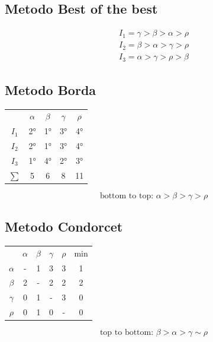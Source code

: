 \documentclass[fontsize=8pt]{scrartcl}
\begin{document}
\begin{multicols*}{2}
\subsection*{Metodo Best of the best}

\begin{align*}
    I_1 = \gamma > \beta > \alpha > \rho\\
    I_2 = \beta > \alpha > \gamma > \rho\\
    I_3 = \alpha > \gamma > \rho > \beta
\end{align*}

\subsection*{Metodo Borda}

\begin{center}
    \begin{tabular}{c c c c c}
                    & \(\alpha\)  & \(\beta\) & \(\gamma\)& \(\rho\)\\
            \(I_1\) & 2°  & 1° & 3° & 4°\\
            \(I_2\) & 2° & 1° & 3° & 4°\\
            \(I_3\) & 1° & 4° & 2° & 3°\\\hline
            \(\sum\)& 5 & 6 & 8 & 11
    \end{tabular}
    \begin{equation*}
        \text{bottom to top: } \alpha > \beta > \gamma > \rho
    \end{equation*}
\end{center}

\subsection*{Metodo Condorcet}

\begin{center}
    \begin{tabular}{c c c c c|c}
                    & \(\alpha\)  & \(\beta\) & \(\gamma\)& \(\rho\) & min\\
            \(\alpha\)  & - & 1 & 3 & 3 & 1\\
            \(\beta\)   & 2 & - & 2 & 2 & 2\\
            \(\gamma\)  & 0 & 1 & - & 3 & 0\\
            \(\rho\)    & 0 & 1 & 0 & - & 0\\
    \end{tabular}
    \begin{equation*}
        \text{top to bottom: } \beta > \alpha > \gamma \sim \rho
    \end{equation*}
\end{center}


\end{multicols*}
\end{document}
